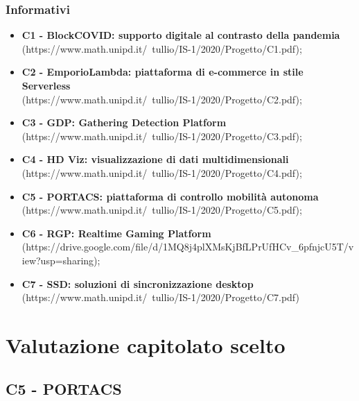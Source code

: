 \documentclass[]{article}
\begin{document}
			\subsubsection{Informativi}
			\begin{itemize}
				\item \textbf{ C1 - BlockCOVID: supporto digitale al contrasto della pandemia} \\
				(https://www.math.unipd.it/~tullio/IS-1/2020/Progetto/C1.pdf);

				\item \textbf{ C2 - EmporioLambda: piattaforma di e-commerce in stile Serverless} \\
				(https://www.math.unipd.it/~tullio/IS-1/2020/Progetto/C2.pdf);

				\item \textbf{ C3 - GDP: Gathering Detection Platform} \\ (https://www.math.unipd.it/~tullio/IS-1/2020/Progetto/C3.pdf);

				\item \textbf{ C4 - HD Viz: visualizzazione di dati multidimensionali} \\
				(https://www.math.unipd.it/~tullio/IS-1/2020/Progetto/C4.pdf);

				\item \textbf{ C5 - PORTACS: piattaforma di controllo mobilità autonoma} \\
				(https://www.math.unipd.it/~tullio/IS-1/2020/Progetto/C5.pdf);

				\item \textbf{ C6 - RGP: Realtime Gaming Platform} \\
				(https://drive.google.com/file/d/1MQ8j4plXMsKjBfLPrUfHCv\_6pfnjcU5T/view?usp=sharing);

				\item \textbf{ C7 - SSD: soluzioni di sincronizzazione desktop} \\
				(https://www.math.unipd.it/~tullio/IS-1/2020/Progetto/C7.pdf)
			\end{itemize}

	\newpage

	\section{Valutazione capitolato scelto}
		\subsection{C5 - PORTACS}
\end{document}
